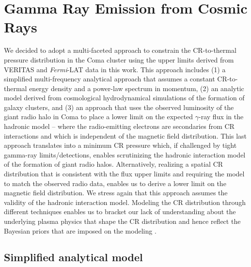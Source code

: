 \documentclass[12pt,manuscript]{aastex}
\def\Fermi{{\em Fermi}\xspace}
\begin{document}
\section{Gamma Ray Emission from Cosmic Rays}
We decided to adopt a multi-faceted approach to constrain the CR-to-thermal pressure distribution in
the Coma cluster using the upper limits derived from VERITAS and \Fermi-LAT data in this work. This
approach includes (1) a simplified multi-frequency analytical approach that assumes a constant
CR-to-thermal energy density and a power-law spectrum in momentum, (2) an analytic model derived
from cosmological hydrodynamical simulations of the formation of galaxy clusters, and (3) an
approach that uses the observed luminosity of the giant radio halo in Coma to place a lower limit on
the expected $\gamma$-ray flux in the hadronic model -- where the radio-emitting electrons are
secondaries from CR interactions and which is independent of the magnetic field distribution.  This
last approach translates into a minimum CR pressure which, if challenged by tight gamma-ray
limits/detections, enables scrutinizing the hadronic interaction model of the formation of giant
radio halos. Alternatively, realizing a spatial CR distribution that is consistent with the flux
upper limits and requiring the model to match the observed radio data, enables us to derive a
lower limit on the magnetic field distribution. We stress again that this approach assumes the
validity of the hadronic interaction model. Modeling the CR distribution through different
techniques enables us to bracket our lack of understanding about the underlying plasma physics that
shape the CR distribution and hence reflect the Bayesian priors that are imposed on the modeling
\citep[see][for a discussion]{article:PinzkePfrommerBergstrom}.

%
%

\subsection{Simplified analytical model}
\label{sec:simple}
\end{document}
